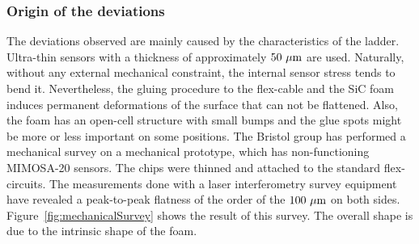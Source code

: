       \subsubsection{Origin of the deviations}

      The deviations observed are mainly caused by the characteristics of the ladder.
      Ultra-thin sensors with a thickness of approximately $50~\rm{\mu m}$ are used.
      Naturally, without any external mechanical constraint, the internal sensor stress tends to bend it.
      Nevertheless, the gluing procedure to the flex-cable and the \gls{SiC} foam induces permanent deformations of the surface that can not be flattened.
      Also, the foam has an open-cell structure with small bumps and the glue spots might be more or less important on some positions.
      The Bristol group has performed a mechanical survey on a mechanical prototype, which has non-functioning \gls{MIMOSA}-20 sensors.
      The chips were thinned and attached to the standard flex-circuits.
      The measurements done with a laser interferometry survey equipment have revealed a peak-to-peak flatness of the order of the $100~\rm{\mu m}$ on both sides.
      Figure~\ref{fig:mechanicalSurvey} shows the result of this survey.
      The overall shape is due to the intrinsic shape of the foam.
       

